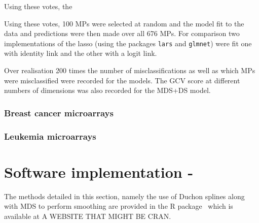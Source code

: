 Using these votes, the


Using these votes, 100 MPs were selected at random and the model fit to the data and predictions were then made over all 676 MPs. For comparison two implementations of the lasso (using the packages \texttt{lars} and \texttt{glmnet}) were fit one with identity link and the other with a logit link.

Over realisation 200 times the number of misclassifications as well as which MPs were misclassified were recorded for the models. The GCV score at different numbers of dimensions was also recorded for the MDS+DS model.




\subsubsection{Breast cancer microarrays}




\subsubsection{Leukemia microarrays}



\section{Software implementation - \mdspack}

The methods detailed in this section, namely the use of Duchon splines along with MDS to perform smoothing are provided in the \textsf{R} package \mdspack\ which is available at A WEBSITE THAT MIGHT BE CRAN.




